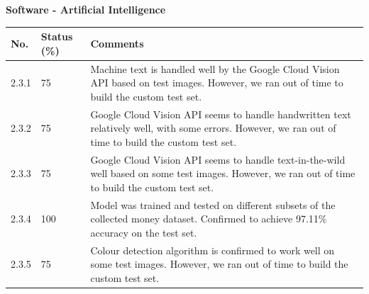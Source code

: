 \documentclass[a4paper,11pt]{article}
\begin{document}
\textbf{Software - Artificial Intelligence}
\begin{table}[ht]
    \centering
    \begin{tabular}{|p{0.7cm}|p{1cm}|p{12cm}|}
        \hline
        No. & Status (\%) & Comments \\ \hline
        
        2.3.1 & 75 & Machine text is handled well by the Google Cloud Vision API based on test images. However, we ran out of time to build the custom test set. \\ \hline
        
        2.3.2 & 75 & Google Cloud Vision API seems to handle handwritten text relatively well, with some errors. However, we ran out of time to build the custom test set. \\ \hline
        
        2.3.3 & 75 & Google Cloud Vision API seems to handle text-in-the-wild well based on some test images. However, we ran out of time to build the custom test set. \\ \hline
        
        2.3.4 & 100 & Model was trained and tested on different subsets of the collected money dataset. Confirmed to achieve 97.11\% accuracy on the test set. \\ \hline
        
        2.3.5 & 75 & Colour detection algorithm is confirmed to work well on some test images. However, we ran out of time to build the custom test set. \\ \hline
    \end{tabular}
\end{table}
\end{document}
